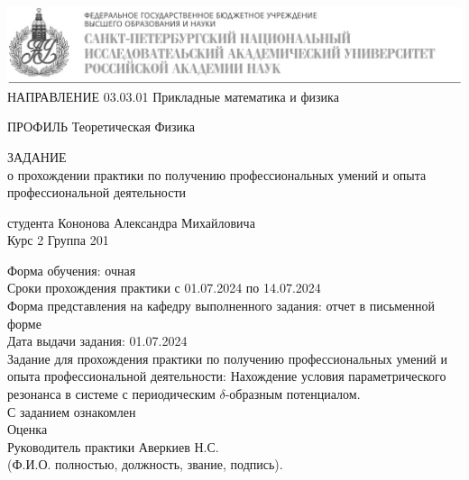 \documentclass[11pt]{article}    %
\begin{document}
\begin{titlepage}
    \includegraphics[scale = 0.43]{alf4.JPG}
    \\

НАПРАВЛЕНИЕ 03.03.01 Прикладные математика и физика
\par ПРОФИЛЬ Теоретическая Физика\\

\begin{center}
\begin{bf}
     ЗАДАНИЕ\\ 
     о прохождении практики по получению профессиональных умений и опыта профессиональной деятельности 
\end{bf}
  


студента Кононова Александра Михайловича \\

Курс 2 Группа 201
\end{center}

Форма обучения: очная \\
Сроки прохождения практики с 01.07.2024 по 14.07.2024 \\
Форма представления на кафедру выполненного задания: 
отчет в письменной форме\\
Дата выдачи задания: 01.07.2024\\
Задание для прохождения практики по получению профессиональных умений и опыта профессиональной деятельности: Нахождение условия параметрического резонанса в системе с периодическим $\delta$-образным потенциалом. \\
С заданием ознакомлен \\
 
Оценка \\
Руководитель практики Аверкиев Н.С.\\
(Ф.И.О. полностью, должность, звание, подпись).

\end{titlepage}
\end{document}
